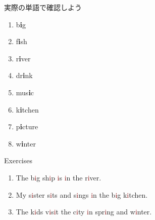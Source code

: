 \documentclass[aspectratio=169,xcolor={dvipsnames,table}]{beamer}
\begin{document}
\begin{frame}[plain]{実際の単語で確認しよう}
\LARGE

\begin{enumerate}
 \item b\textcolor{NavyBlue}{\bfseries i}g%
\hfill{}\hspace{150pt}\mbox{}
 \item f\textcolor{NavyBlue}{\bfseries i}sh%
\hfill{}\hspace{150pt}\mbox{}
 \item r\textcolor{NavyBlue}{\bfseries i}ver%
\hfill{}\hspace{150pt}\mbox{}
 \item dr\textcolor{NavyBlue}{\bfseries i}nk%
\hfill{}\hspace{150pt}\mbox{}
 \item mus\textcolor{NavyBlue}{\bfseries i}c%
\hfill{}\hspace{150pt}\mbox{} 
\item k\textcolor{NavyBlue}{\bfseries i}tchen%
\hfill{}\hspace{150pt}\mbox{}
 \item p\textcolor{NavyBlue}{\bfseries i}cture%
\hfill{}\hspace{150pt}\mbox{}
 \item w\textcolor{NavyBlue}{\bfseries i}nter%
\hfill{}\hspace{150pt}\mbox{}
\end{enumerate}
\end{frame}
\begin{frame}[plain]{Exercises}
\LARGE

\begin{enumerate}
 \item The b\textcolor{Maroon}{i}g sh\textcolor{Maroon}{i}p \textcolor{Maroon}{i}s \textcolor{Maroon}{i}n the r\textcolor{Maroon}{i}ver.
 \item My s\textcolor{Maroon}{i}ster s\textcolor{Maroon}{i}ts and s\textcolor{Maroon}{i}ngs \textcolor{Maroon}{i}n the b\textcolor{Maroon}{i}g k\textcolor{Maroon}{i}tchen.
 \item The k\textcolor{Maroon}{i}ds v\textcolor{Maroon}{i}s\textcolor{Maroon}{i}t the c\textcolor{Maroon}{i}ty \textcolor{Maroon}{i}n spr\textcolor{Maroon}{i}ng and w\textcolor{Maroon}{i}nter.

\end{enumerate}
\end{frame}
\end{document}
